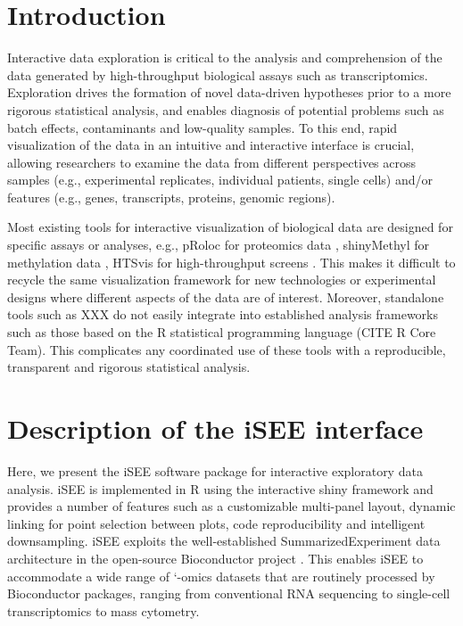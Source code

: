 \documentclass{bioinfo}
\begin{document}
\maketitle

\section{Introduction}
Interactive data exploration is critical to the analysis and comprehension of the data generated by high-throughput biological assays such as transcriptomics. 
Exploration drives the formation of novel data-driven hypotheses prior to a more rigorous statistical analysis, and enables diagnosis of potential problems such as batch effects, contaminants and low-quality samples. 
To this end, rapid visualization of the data in an intuitive and interactive interface is crucial, allowing researchers to examine the data from different perspectives across samples (e.g., experimental replicates, individual patients, single cells) and/or features (e.g., genes, transcripts, proteins, genomic regions).

Most existing tools for interactive visualization of biological data are designed for specific assays or analyses, e.g., pRoloc for proteomics data \citep{gatto2014mass}, shinyMethyl for methylation data \citep{fortin2014shinymethyl}, HTSvis for high-throughput screens \citep{scheeder2017htsvis}.
This makes it difficult to recycle the same visualization framework for new technologies or experimental designs where different aspects of the data are of interest. 
Moreover, standalone tools such as XXX do not easily integrate into established analysis frameworks such as those based on the R statistical programming language (CITE R Core Team). 
This complicates any coordinated use of these tools with a reproducible, transparent and rigorous statistical analysis. 

\section{Description of the iSEE interface}
Here, we present the iSEE software package for interactive exploratory data analysis. 
iSEE is implemented in R using the interactive shiny framework and provides a number of features such as a customizable multi-panel layout, dynamic linking for point selection between plots, code reproducibility and intelligent downsampling. 
iSEE exploits the well-established SummarizedExperiment data architecture in the open-source Bioconductor project \citep{gentleman2004bioconductor}.
This enables iSEE to accommodate a wide range of `-omics datasets that are routinely processed by Bioconductor packages, ranging from conventional RNA sequencing to single-cell transcriptomics to mass cytometry.
\end{document}
